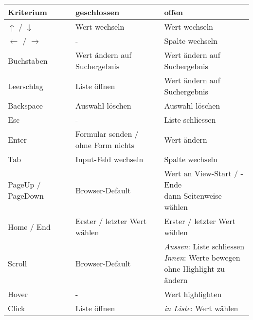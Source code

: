 \begin{table}[ht!]
    \label{table:interactionNewComponent}
    \footnotesize
    \begin{threeparttable}
        \begin{tabular}{ l || l | l }
            \bf{Kriterium}    & \bf{geschlossen} & \bf{offen} \\
            \hline \hline
            $\uparrow$ / $\downarrow$     & Wert wechseln       & Wert wechseln       \\
            \hline
            $\leftarrow$ / $\rightarrow$  & -                   & Spalte wechseln     \\
            \hline
            Buchstaben  & Wert ändern auf Suchergebnis\tnote{1} & Wert ändern auf Suchergebnis\tnote{1}  \\
            \hline
            Leerschlag  & Liste öffnen    & Wert ändern auf Suchergebnis\tnote{1}     \\
            \hline
            Backspace   & Auswahl löschen & Auswahl löschen        \\
            \hline
            Esc         & -               & Liste schliessen       \\
            \hline \hline
            Enter       & \tbbr{Formular senden / \\ ohne Form nichts} & Wert ändern  \\
            \hline
            Tab         & Input-Feld wechseln              & Spalte wechseln     \\
            \hline
            PageUp / PageDown  & Browser-Default\tnote{2} & \tbbr{Wert an View-Start / -Ende \\ dann Seitenweise wählen} \\
            \hline
            Home / End & Erster / letzter Wert wählen     & Erster / letzter Wert wählen  \\
            \hline \hline
            Scroll     & Browser-Default\tnote{2}         & \tbbr{\textit{Aussen}: Liste schliessen \\
                                                                  \textit{Innen}: Werte bewegen \\ ohne Highlight zu ändern} \\
            \hline
            Hover      & -                & Wert highlighten       \\
            \hline
            Click      & Liste öffnen     & \tbbr{\textit{in Liste}: Wert wählen \\
}
\end{tabular}
\end{threeparttable}
\end{table}
